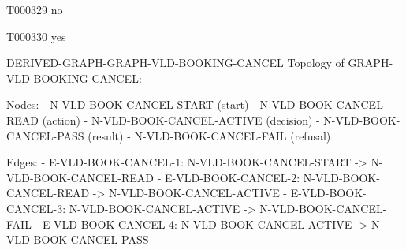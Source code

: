 \documentclass[11pt,a4paper]{article}
\begin{document}
\begin{atlastext}{T000329}
no
\end{atlastext}
\begin{atlastext}{T000330}
yes
\end{atlastext}
\par\noindent\begin{minipage}{\linewidth}
\begin{atlasderived}{DERIVED-GRAPH-GRAPH-VLD-BOOKING-CANCEL}
Topology of GRAPH-VLD-BOOKING-CANCEL:

Nodes:
- N-VLD-BOOK-CANCEL-START (start)
- N-VLD-BOOK-CANCEL-READ (action)
- N-VLD-BOOK-CANCEL-ACTIVE (decision)
- N-VLD-BOOK-CANCEL-PASS (result)
- N-VLD-BOOK-CANCEL-FAIL (refusal)

Edges:
- E-VLD-BOOK-CANCEL-1: N-VLD-BOOK-CANCEL-START -> N-VLD-BOOK-CANCEL-READ
- E-VLD-BOOK-CANCEL-2: N-VLD-BOOK-CANCEL-READ -> N-VLD-BOOK-CANCEL-ACTIVE
- E-VLD-BOOK-CANCEL-3: N-VLD-BOOK-CANCEL-ACTIVE -> N-VLD-BOOK-CANCEL-FAIL
- E-VLD-BOOK-CANCEL-4: N-VLD-BOOK-CANCEL-ACTIVE -> N-VLD-BOOK-CANCEL-PASS
\end{atlasderived}
\end{minipage}\par
\clearpage
{}\par
{}\par
\end{document}
